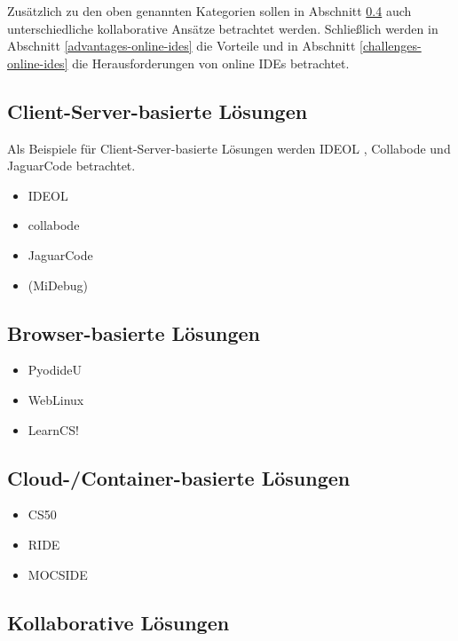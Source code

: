 Zusätzlich zu den oben genannten Kategorien sollen in Abschnitt \ref{collaborative-approaches} auch unterschiedliche kollaborative Ansätze betrachtet werden. Schließlich werden in Abschnitt \ref{advantages-online-ides} die Vorteile und in Abschnitt \ref{challenges-online-ides} die Herausforderungen von online IDEs betrachtet.

\subsection{Client-Server-basierte Lösungen} \label{client-server-based-approaches}

Als Beispiele für Client-Server-basierte Lösungen werden IDEOL \cite{IDEOL-2013}, Collabode \cite{Collabode-2011} und JaguarCode \cite{JaguarCode-2018} betrachtet.

\begin{itemize}
    \item IDEOL
    \item collabode
    \item JaguarCode
    \item (MiDebug)
\end{itemize}

\subsection{Browser-basierte Lösungen} \label{browser-based-approaches}

\begin{itemize}
    \item PyodideU
    \item WebLinux
    \item LearnCS!
\end{itemize}

\subsection{Cloud-/Container-basierte Lösungen} \label{cloud-container-based-approaches}

\begin{itemize}
    \item CS50
    \item RIDE
    \item MOCSIDE
\end{itemize}

\subsection{Kollaborative Lösungen} \label{collaborative-approaches}

